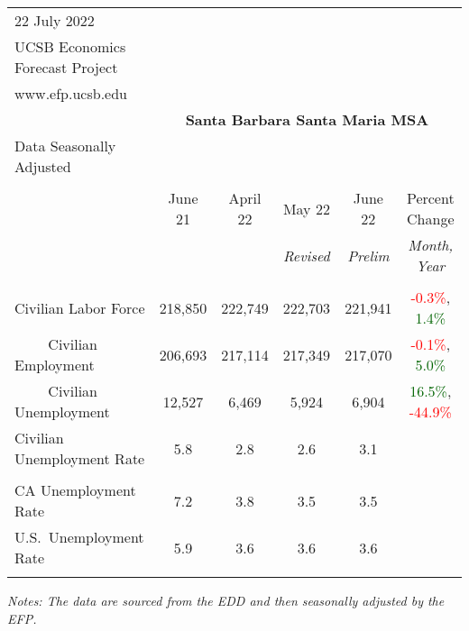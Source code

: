 \documentclass[12pt]{article}
\begin{document}
\begin{table}
\begin{tabular}{|l|c|c|c|c|c|}
\multicolumn{1}{l}{\small 22 July 2022} & \multicolumn{5}{c}{} \\
\multicolumn{1}{l}{\small UCSB Economics Forecast Project} & \multicolumn{5}{c}{} \\
\multicolumn{1}{l}{\small www.efp.ucsb.edu} & \multicolumn{5}{c}{} \\
\multicolumn{1}{c}{} & \multicolumn{5}{c}{\large \textbf{Santa Barbara Santa Maria MSA}} \\
\multicolumn{1}{l}{\small Data Seasonally Adjusted} & \multicolumn{5}{c}{} \\ \hline \hline
& & & & & \\
 & June 21 & April 22 & May 22 & June 22 & Percent Change \\
 & & & \small \textit{Revised} & \small \textit{Prelim} & \small \textit{Month, Year} \\ \hline
& & & & & \\
Civilian Labor Force & 218,850 & 222,749 & 222,703 & 221,941 & \textcolor{red}{-0.3\%}, \textcolor{darkgreen}{1.4\%} \\
$\qquad$ \small Civilian Employment & 206,693 & 217,114 & 217,349 & 217,070 & \textcolor{red}{-0.1\%}, \textcolor{darkgreen}{5.0\%} \\
$\qquad$ \small Civilian Unemployment & 12,527 & 6,469 & 5,924 & 6,904 & \textcolor{darkgreen}{16.5\%}, \textcolor{red}{-44.9\%} \\
Civilian Unemployment Rate & 5.8 & 2.8 & 2.6 & 3.1 & \\
& & & & & \\
CA Unemployment Rate & 7.2 & 3.8 & 3.5 & 3.5 & \\
U.S.\ Unemployment Rate & 5.9 & 3.6 & 3.6 & 3.6 & \\
& & & & & \\ \hline \hline
\end{tabular}
\par
\vspace{.5em}
\footnotesize
\textit{Notes: The data are sourced from the EDD and then seasonally adjusted by the EFP.}
\end{table}
\end{document}
